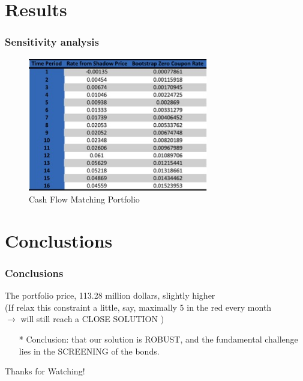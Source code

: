 \documentclass[compress,handout,10pt]{beamer}
\let\olditem\item
\renewcommand{\item}{\setlength{\itemsep}{0.5\baselineskip}\olditem}
\begin{document}
\section{Results}
\begin{frame}
    \frametitle{Sensitivity analysis}
\begin{figure}[htb]
  \begin{center}
      \includegraphics[width=0.7\textwidth]
{cf.jpg}
    \end{center}
    \caption{Cash Flow Matching Portfolio}
\end{figure}
\end{frame}

\section{Conclustions}
\begin{frame}
    \frametitle{Conclusions}
The portfolio price, 113.28 million dollars, slightly higher\\
\vspace{3mm}
(If relax this constraint a little, say, maximally 5 in the red every month \\ $\rightarrow$ will still reach a CLOSE SOLUTION )\\
\vspace{12mm}
\begin{itemize}
\item[*]Conclusion: that our solution is ROBUST, and the fundamental challenge lies in the SCREENING of the bonds.
\end{itemize}
\end{frame}


\begin{frame}
\Huge\centerline {Thanks for Watching!}
\end{frame}
\end{document}
